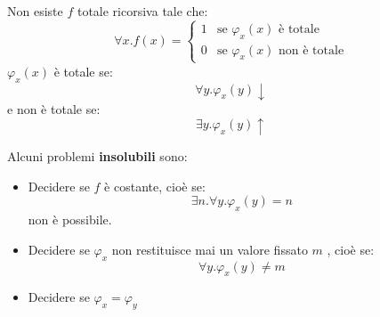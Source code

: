 \documentclass[a4paper]{article}
\begin{document}
\begin{definition}
  Non esiste \( f \) totale ricorsiva tale che:
  \[
    \forall x . f(x) = 
    \begin{cases}
      1 & \text{se } \varphi_x(x) \text{ è totale} \\
      0 & \text{se } \varphi_x(x) \text{ non è totale}
    \end{cases}
  \] 
  \( \varphi_x(x) \) è totale se:
  \[
    \forall y . \varphi_x(y) \downarrow
  \] 
  e non è totale se:
  \[
    \exists y . \varphi_x(y) \uparrow
  \] 
\end{definition}
Alcuni problemi \textbf{insolubili} sono:
\begin{itemize}
  \item 
    Decidere se \( f \) è costante, cioè se:
    \[
      \exists n . \forall y . \varphi_x(y) = n
    \] 
    non è possibile.

  \item 
    Decidere se \( \varphi_x \) non restituisce mai un valore fissato \( m \) , cioè se:
    \[
      \forall y . \varphi_x(y) \ne m
    \] 

  \item Decidere se \( \varphi_x = \varphi_y \)
\end{itemize}
\end{document}
